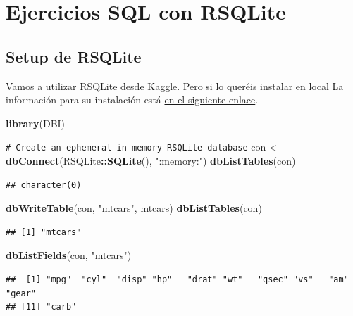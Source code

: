 \documentclass[
]{book}
\newenvironment{Shaded}{\begin{snugshade}}{\end{snugshade}}
\newcommand{\CommentTok}[1]{\textcolor[rgb]{0.56,0.35,0.01}{\textit{#1}}}
\newcommand{\FunctionTok}[1]{\textcolor[rgb]{0.13,0.29,0.53}{\textbf{#1}}}
\newcommand{\NormalTok}[1]{#1}
\newcommand{\OtherTok}[1]{\textcolor[rgb]{0.56,0.35,0.01}{#1}}
\newcommand{\SpecialCharTok}[1]{\textcolor[rgb]{0.81,0.36,0.00}{\textbf{#1}}}
\newcommand{\StringTok}[1]{\textcolor[rgb]{0.31,0.60,0.02}{#1}}
\theoremstyle{break}
\theoremstyle{nonumberplain}
\renewcommand{\CommentTok}[1]{\textcolor[rgb]{0.41,0.41,0.41}{\texttt{#1}}}
\begin{document}
\section{Ejercicios SQL con RSQLite}\label{ejercicios-sql-con-rsqlite}

\subsection{Setup de RSQLite}\label{setup-de-rsqlite}

Vamos a utilizar \href{https://cran.r-project.org/web/packages/RSQLite/index.html}{RSQLite} desde Kaggle. Pero si lo queréis instalar en local La información para su instalación está \href{https://db.rstudio.com/databases/sqlite/}{en el siguiente enlace}.

\begin{Shaded}
\begin{Highlighting}[]
\FunctionTok{library}\NormalTok{(DBI)}

\CommentTok{\# Create an ephemeral in{-}memory RSQLite database}
\NormalTok{con }\OtherTok{\textless{}{-}} \FunctionTok{dbConnect}\NormalTok{(RSQLite}\SpecialCharTok{::}\FunctionTok{SQLite}\NormalTok{(), }\StringTok{":memory:"}\NormalTok{)}
\FunctionTok{dbListTables}\NormalTok{(con)}
\end{Highlighting}
\end{Shaded}

\begin{verbatim}
## character(0)
\end{verbatim}

\begin{Shaded}
\begin{Highlighting}[]
\FunctionTok{dbWriteTable}\NormalTok{(con, }\StringTok{"mtcars"}\NormalTok{, mtcars)}
\FunctionTok{dbListTables}\NormalTok{(con)}
\end{Highlighting}
\end{Shaded}

\begin{verbatim}
## [1] "mtcars"
\end{verbatim}

\begin{Shaded}
\begin{Highlighting}[]
\FunctionTok{dbListFields}\NormalTok{(con, }\StringTok{"mtcars"}\NormalTok{)}
\end{Highlighting}
\end{Shaded}

\begin{verbatim}
##  [1] "mpg"  "cyl"  "disp" "hp"   "drat" "wt"   "qsec" "vs"   "am"   "gear"
## [11] "carb"
\end{verbatim}
\end{document}
